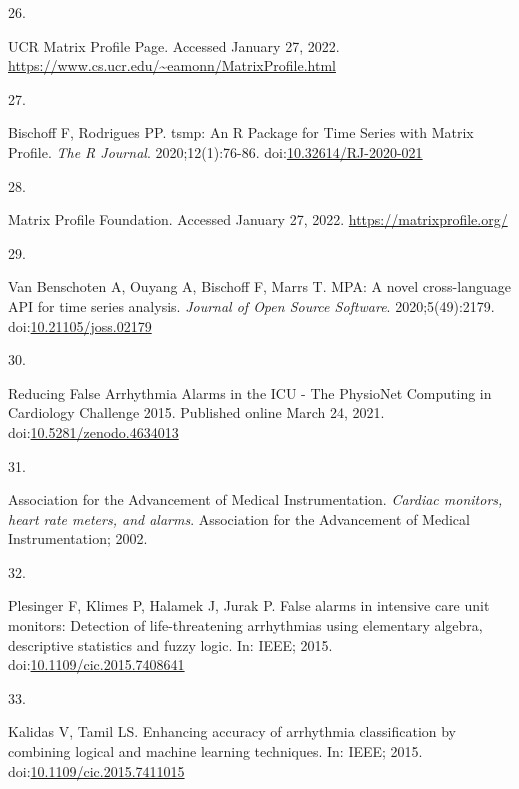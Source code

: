 \documentclass[12pt,twoside]{fmupthesis}
\newlength{\csllabelwidth}
\newlength{\cslhangindent}
\newenvironment{CSLReferences}[2] %
 {%
  \setlength{\parindent}{0pt}
  \ifodd #1 \everypar{\setlength{\hangindent}{\cslhangindent}}\ignorespaces\fi
  \ifnum #2 > 0
  \setlength{\parskip}{#2\baselineskip}
  \fi
 }%
 {}
\newcommand{\CSLLeftMargin}[1]{\parbox[t]{\csllabelwidth}{#1}}
\newcommand{\CSLRightInline}[1]{\parbox[t]{\linewidth - \csllabelwidth}{#1}}
\begin{document}
\begin{CSLReferences}{0}{0}
\leavevmode{}%
\CSLLeftMargin{26. }
\CSLRightInline{{UCR Matrix Profile Page}. Accessed January 27, 2022. \url{https://www.cs.ucr.edu/~eamonn/MatrixProfile.html}}

\leavevmode{}%
\CSLLeftMargin{27. }
\CSLRightInline{Bischoff F, Rodrigues PP. {tsmp: An R Package for Time Series with Matrix Profile}. \emph{{The R Journal}}. 2020;12(1):76-86. doi:\href{https://doi.org/10.32614/RJ-2020-021}{10.32614/RJ-2020-021}}

\leavevmode{}%
\CSLLeftMargin{28. }
\CSLRightInline{{Matrix Profile Foundation}. Accessed January 27, 2022. \url{https://matrixprofile.org/}}

\leavevmode{}%
\CSLLeftMargin{29. }
\CSLRightInline{Van Benschoten A, Ouyang A, Bischoff F, Marrs T. MPA: A novel cross-language API for time series analysis. \emph{Journal of Open Source Software}. 2020;5(49):2179. doi:\href{https://doi.org/10.21105/joss.02179}{10.21105/joss.02179}}

\leavevmode{}%
\CSLLeftMargin{30. }
\CSLRightInline{Reducing False Arrhythmia Alarms in the ICU - The PhysioNet Computing in Cardiology Challenge 2015. Published online March 24, 2021. doi:\href{https://doi.org/10.5281/zenodo.4634013}{10.5281/zenodo.4634013}}

\leavevmode{}%
\CSLLeftMargin{31. }
\CSLRightInline{Association for the Advancement of Medical Instrumentation. \emph{{Cardiac monitors, heart rate meters, and alarms}}. Association for the Advancement of Medical Instrumentation; 2002.}

\leavevmode{}%
\CSLLeftMargin{32. }
\CSLRightInline{Plesinger F, Klimes P, Halamek J, Jurak P. False alarms in intensive care unit monitors: Detection of life-threatening arrhythmias using elementary algebra, descriptive statistics and fuzzy logic. In: IEEE; 2015. doi:\href{https://doi.org/10.1109/cic.2015.7408641}{10.1109/cic.2015.7408641}}

\leavevmode{}%
\CSLLeftMargin{33. }
\CSLRightInline{Kalidas V, Tamil LS. Enhancing accuracy of arrhythmia classification by combining logical and machine learning techniques. In: IEEE; 2015. doi:\href{https://doi.org/10.1109/cic.2015.7411015}{10.1109/cic.2015.7411015}}


\end{CSLReferences}
\end{document}
